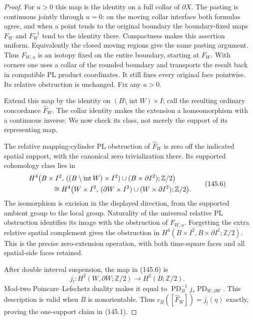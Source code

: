 \begin{proof}
For $u>0$ this map is the identity on a full collar of $\partial X$.
The pasting is continuous jointly through $u=0$: on the moving
collar interface both formulas agree, and when a point tends to the
original boundary the boundary-fixed maps $F_W$ and $F_W^{-1}$
tend to the identity there. Compactness makes this assertion uniform.
Equivalently the closed moving regions give the same pasting
argument. Thus $F_{W,u}$ is an isotopy fixed on the entire boundary,
starting at $F_W$. With corners one uses a collar of the rounded
boundary and transports the result back in compatible PL product
coordinates. It still fixes every original face pointwise. Its
relative obstruction is unchanged. Fix any $u>0$.

Extend this map by the identity on $(B\setminus\operatorname{int}W)
\times I$; call the resulting ordinary concordance $\widehat F_W$.
The collar identity makes the extension a homeomorphism with a
continuous inverse. We now check its class, not merely the support
of its representing map.

The relative mapping-cylinder PL obstruction of $\widehat F_W$ is
zero off the indicated spatial support, with the canonical zero
trivialization there. Its supported cohomology class lies in
\[
 \begin{split}
 &H^4\bigl(B\times I^2,\,
 ((B\setminus\operatorname{int}W)\times I^2)
                  \cup(B\times\partial I^2);\mathbb Z/2\bigr)\\
 &\hspace{12mm}\cong
 H^4\bigl(W\times I^2,\,
     (\partial W\times I^2)\cup(W\times\partial I^2);
                          \mathbb Z/2\bigr).
 \end{split}
 \tag{145.6}
\]
The isomorphism is excision in the displayed direction, from the
supported ambient group to the local group. Naturality of the
universal relative PL obstruction identifies its image with the
obstruction of $F_{W,u}$. Forgetting the extra relative spatial
complement gives the obstruction in
$H^4(B\times I^2,B\times\partial I^2;\mathbb Z/2)$.
This is the precise zero-extension operation, with both time-square
faces and all spatial-side faces retained.

After double interval suspension, the map in (145.6) is
\[
          j_!:H^2(W,\partial W;\mathbb Z/2)
                             \longrightarrow H^2(B;\mathbb Z/2).
 \tag{145.7}
\]
Mod-two Poincare--Lefschetz duality makes it equal to
$\operatorname{PD}_B^{-1}j_*\operatorname{PD}_{W,\partial W}$.
This description is valid when $B$ is nonorientable. Thus
$c_B([\widehat F_W])=j_!(\eta)$ exactly, proving the one-support
claim in (145.1).


\end{proof}
